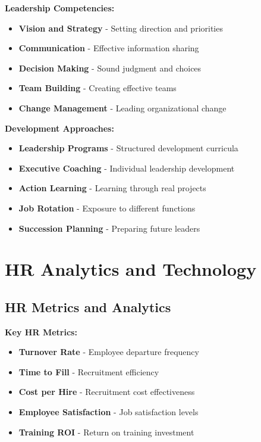 \documentclass[12pt]{article}
\begin{document}
\textbf{Leadership Competencies:}
\begin{itemize}
    \item \textbf{Vision and Strategy} - Setting direction and priorities
    \item \textbf{Communication} - Effective information sharing
    \item \textbf{Decision Making} - Sound judgment and choices
    \item \textbf{Team Building} - Creating effective teams
    \item \textbf{Change Management} - Leading organizational change
\end{itemize}

\textbf{Development Approaches:}
\begin{itemize}
    \item \textbf{Leadership Programs} - Structured development curricula
    \item \textbf{Executive Coaching} - Individual leadership development
    \item \textbf{Action Learning} - Learning through real projects
    \item \textbf{Job Rotation} - Exposure to different functions
    \item \textbf{Succession Planning} - Preparing future leaders
\end{itemize}

\section{HR Analytics and Technology}

\subsection{HR Metrics and Analytics}

\textbf{Key HR Metrics:}
\begin{itemize}
    \item \textbf{Turnover Rate} - Employee departure frequency
    \item \textbf{Time to Fill} - Recruitment efficiency
    \item \textbf{Cost per Hire} - Recruitment cost effectiveness
    \item \textbf{Employee Satisfaction} - Job satisfaction levels
    \item \textbf{Training ROI} - Return on training investment
\end{itemize}
\end{document}
